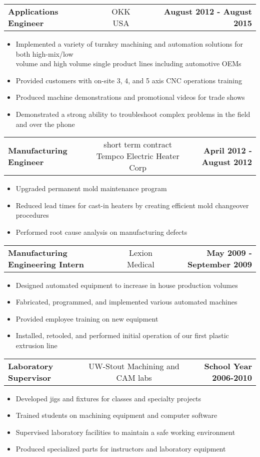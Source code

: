 \documentclass[11pt,letterpaper]{article}
\makeatletter
\newcommand{\headerrow}[3]
{\vspace{0.4em}
\noindent
\begin{tabular*}{\textwidth}{l @{\extracolsep{\fill}} cr}
	\textbf{#1} & %
	#2 &		  %
	\textbf{#3}\\ %
\end{tabular*}}
\makeatother
\begin{document}
	\headerrow
		{Applications Engineer}
		{OKK USA}
		{August 2012 - August 2015}
	\begin{itemize}
		\item Implemented a variety of turnkey machining and automation solutions for both high-mix/low \\volume and high volume single product lines including automotive OEMs
		\item Provided customers with on-site 3, 4, and 5 axis CNC operations training
		\item Produced machine demonstrations and promotional videos%
				for trade shows
		\item Demonstrated a strong ability to troubleshoot complex problems in the field and over the phone
	\end{itemize}
	
	\headerrow
		{Manufacturing Engineer}
		{short term contract Tempco Electric Heater Corp}
		{April 2012 - August 2012}
	\begin{itemize}
		\item Upgraded permanent mold maintenance program
		\item Reduced lead times for cast-in heaters by creating efficient mold changeover procedures
		\item Performed root cause analysis on manufacturing defects
	\end{itemize}

	\headerrow
		{Manufacturing Engineering Intern}
		{Lexion Medical}
		{May 2009 - September 2009}
	\begin{itemize}
		\item Designed automated equipment to increase in house production volumes
		\item Fabricated, programmed, and implemented various automated machines
		\item Provided employee training on new equipment
		\item Installed, retooled, and performed initial operation of our first plastic extrusion line
	\end{itemize}

	\headerrow
		{Laboratory Supervisor}
		{UW-Stout Machining and CAM labs}
		{School Year 2006-2010}
	\begin{itemize}
		\item Developed jigs and fixtures for classes and specialty projects
		\item Trained students on machining equipment and computer software
		\item Supervised laboratory facilities to maintain a safe working environment
		\item Produced specialized parts for instructors and laboratory equipment
	\end{itemize}
	
\end{document}
